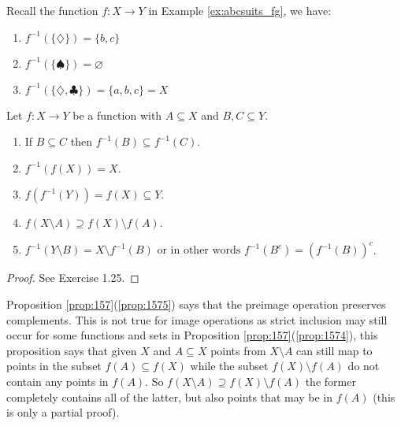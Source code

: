 \begin{example}
    Recall the function $f:X\to Y$ in Example \ref{ex:abcsuits_fg}, we have:
    \begin{enumerate}
        \item $f^{-1}(\{\diamondsuit\}) = \{b,c\}$
        \item $f^{-1}(\{\spadesuit\}) = \varnothing$
        \item $f^{-1}(\{\diamondsuit,\clubsuit\}) = \{a,b,c\} = X$
    \end{enumerate}
\end{example}

\begin{proposition} Let $f : X \to Y$ be a function with $A \subseteq X$ and $B,C \subseteq Y$.
    \label{prop:157}
    \begin{enumerate}
        \item If $B \subseteq C$ then $f^{-1}(B) \subseteq f^{-1}(C)$. \label{prop:1571}
        \item $f^{-1}(f(X)) = X$. \label{prop:1572}
        \item $f(f^{-1}(Y)) = f(X) \subseteq Y$. \label{prop:1573}
        \item $f(X \setminus A) \supseteq f(X) \setminus f(A)$. \label{prop:1574}
        \item $f^{-1}(Y \setminus B) = X \setminus f^{-1}(B) \text{ or in other words } f^{-1}(B^c)= (f^{-1}(B))^c$. \label{prop:1575}
    \end{enumerate}
\end{proposition}

\begin{proof}
    See Exercise 1.25.
\end{proof}

Proposition \ref{prop:157}(\ref{prop:1575}) says that the preimage operation preserves complements. This is not true for image operations as strict inclusion may still occur for some functions and sets in Proposition \ref{prop:157}(\ref{prop:1574}), this proposition says that given $X$ and $A \subseteq X$ points from $X \setminus A$ can still map to points in the subset $f(A) \subseteq f(X)$ while the subset $f(X) \setminus f(A)$ do not contain any points in $f(A)$. So $f(X \setminus A) \supseteq f(X)\setminus f(A)$ the former completely contains all of the latter, but also points that may be in $f(A)$ (this is only a partial proof).


